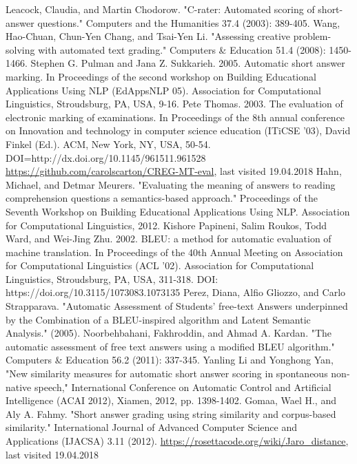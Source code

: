 \documentclass[rnd]{mas_report}
\begin{document}
\begin{thebibliography}{3}
  Leacock, Claudia, and Martin Chodorow. "C-rater: Automated scoring of short-answer questions." Computers and the Humanities 37.4 (2003): 389-405.
 Wang, Hao-Chuan, Chun-Yen Chang, and Tsai-Yen Li. "Assessing creative problem-solving with automated text grading." Computers \& Education 51.4 (2008): 1450-1466.
 Stephen G. Pulman and Jana Z. Sukkarieh. 2005. Automatic short answer marking. In Proceedings of the second workshop on Building Educational Applications Using NLP (EdAppsNLP 05). Association for Computational Linguistics, Stroudsburg, PA, USA, 9-16.
 Pete Thomas. 2003. The evaluation of electronic marking of examinations. In Proceedings of the 8th annual conference on Innovation and technology in computer science education (ITiCSE '03), David Finkel (Ed.). ACM, New York, NY, USA, 50-54. DOI=http://dx.doi.org/10.1145/961511.961528
 \url{https://github.com/carolscarton/CREG-MT-eval}, last visited 19.04.2018
 Hahn, Michael, and Detmar Meurers. "Evaluating the meaning of answers to reading comprehension questions a semantics-based approach." Proceedings of the Seventh Workshop on Building Educational Applications Using NLP. Association for Computational Linguistics, 2012.
 Kishore Papineni, Salim Roukos, Todd Ward, and Wei-Jing Zhu. 2002. BLEU: a method for automatic evaluation of machine translation. In Proceedings of the 40th Annual Meeting on Association for Computational Linguistics (ACL '02). Association for Computational Linguistics, Stroudsburg, PA, USA, 311-318. DOI: https://doi.org/10.3115/1073083.1073135
 Perez, Diana, Alfio Gliozzo, and Carlo Strapparava. "Automatic Assessment of Students’ free-text Answers underpinned by the Combination of a BLEU-inspired algorithm and Latent Semantic Analysis." (2005).
 Noorbehbahani, Fakhroddin, and Ahmad A. Kardan. "The automatic assessment of free text answers using a modified BLEU algorithm." Computers \& Education 56.2 (2011): 337-345.
 Yanling Li and Yonghong Yan, "New similarity measures for automatic short answer scoring in spontaneous non-native speech," International Conference on Automatic Control and Artificial Intelligence (ACAI 2012), Xiamen, 2012, pp. 1398-1402.
 Gomaa, Wael H., and Aly A. Fahmy. "Short answer grading using string similarity and corpus-based similarity." International Journal of Advanced Computer Science and Applications (IJACSA) 3.11 (2012).
 \url{https://rosettacode.org/wiki/Jaro_distance}, last visited 19.04.2018

\end{thebibliography}
\end{document}
